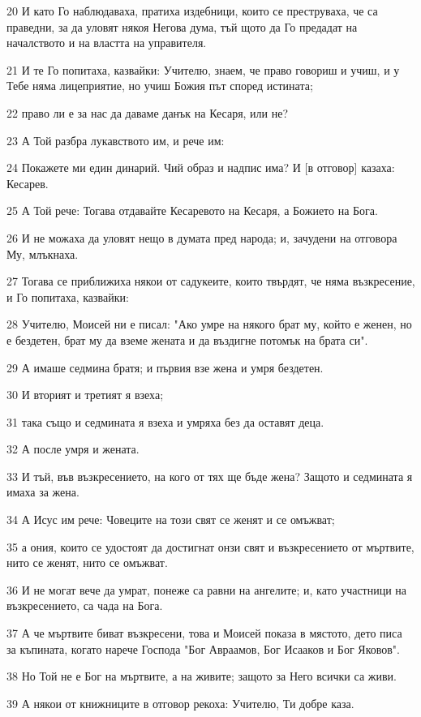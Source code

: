 \par 20 И като Го наблюдаваха, пратиха издебници, които се преструваха, че са праведни, за да уловят някоя Негова дума, тъй щото да Го предадат на началството и на властта на управителя.
\par 21 И те Го попитаха, казвайки: Учителю, знаем, че право говориш и учиш, и у Тебе няма лицеприятие, но учиш Божия път според истината;
\par 22 право ли е за нас да даваме данък на Кесаря, или не?
\par 23 А Той разбра лукавството им, и рече им:
\par 24 Покажете ми един динарий. Чий образ и надпис има? И [в отговор] казаха: Кесарев.
\par 25 А Той рече: Тогава отдавайте Кесаревото на Кесаря, а Божието на Бога.
\par 26 И не можаха да уловят нещо в думата пред народа; и, зачудени на отговора Му, млъкнаха.
\par 27 Тогава се приближиха някои от садукеите, които твърдят, че няма възкресение, и Го попитаха, казвайки:
\par 28 Учителю, Моисей ни е писал: "Ако умре на някого брат му, който е женен, но е бездетен, брат му да вземе жената и да въздигне потомък на брата си".
\par 29 А имаше седмина братя; и първия взе жена и умря бездетен.
\par 30 И вторият и третият я взеха;
\par 31 така също и седмината я взеха и умряха без да оставят деца.
\par 32 А после умря и жената.
\par 33 И тъй, във възкресението, на кого от тях ще бъде жена? Защото и седмината я имаха за жена.
\par 34 А Исус им рече: Човеците на този свят се женят и се омъжват;
\par 35 а ония, които се удостоят да достигнат онзи свят и възкресението от мъртвите, нито се женят, нито се омъжват.
\par 36 И не могат вече да умрат, понеже са равни на ангелите; и, като участници на възкресението, са чада на Бога.
\par 37 А че мъртвите биват възкресени, това и Моисей показа в мястото, дето писа за къпината, когато нарече Господа "Бог Авраамов, Бог Исааков и Бог Яковов".
\par 38 Но Той не е Бог на мъртвите, а на живите; защото за Него всички са живи.
\par 39 А някои от книжниците в отговор рекоха: Учителю, Ти добре каза.
